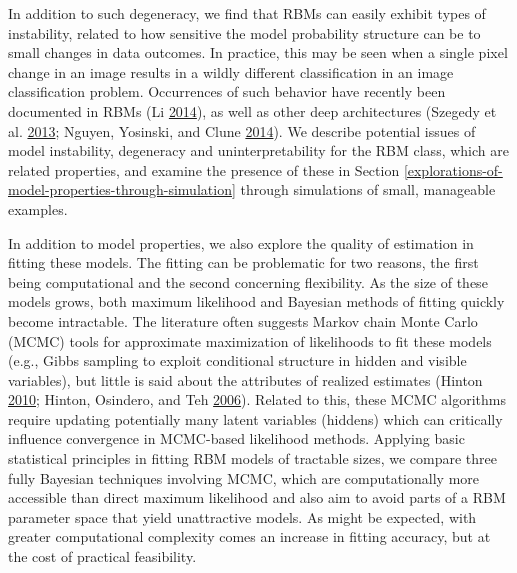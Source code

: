 \documentclass[12pt]{article}
\theoremstyle{definition}
\begin{document}
In addition to such degeneracy, we find that RBMs can easily exhibit
types of instability, related to how sensitive the model probability
structure can be to small changes in data outcomes. In practice, this
may be seen when a single pixel change in an image results in a wildly
different classification in an image classification problem. Occurrences
of such behavior have recently been documented in RBMs (Li
\protect\hyperlink{ref-li2014biclustering}{2014}), as well as other deep
architectures (Szegedy et al.
\protect\hyperlink{ref-szegedy2013intriguing}{2013}; Nguyen, Yosinski,
and Clune \protect\hyperlink{ref-nguyen2014deep}{2014}). We describe
potential issues of model instability, degeneracy and uninterpretability
for the RBM class, which are related properties, and examine the
presence of these in Section
\ref{explorations-of-model-properties-through-simulation} through
simulations of small, manageable examples.

In addition to model properties, we also explore the quality of
estimation in fitting these models. The fitting can be problematic for
two reasons, the first being computational and the second concerning
flexibility. As the size of these models grows, both maximum likelihood
and Bayesian methods of fitting quickly become intractable. The
literature often suggests Markov chain Monte Carlo (MCMC) tools for
approximate maximization of likelihoods to fit these models (e.g., Gibbs
sampling to exploit conditional structure in hidden and visible
variables), but little is said about the attributes of realized
estimates (Hinton \protect\hyperlink{ref-hinton2010practical}{2010};
Hinton, Osindero, and Teh \protect\hyperlink{ref-hinton2006fast}{2006}).
Related to this, these MCMC algorithms require updating potentially many
latent variables (hiddens) which can critically influence convergence in
MCMC-based likelihood methods. Applying basic statistical principles in
fitting RBM models of tractable sizes, we compare three fully Bayesian
techniques involving MCMC, which are computationally more accessible
than direct maximum likelihood and also aim to avoid parts of a RBM
parameter space that yield unattractive models. As might be expected,
with greater computational complexity comes an increase in fitting
accuracy, but at the cost of practical feasibility.
\end{document}
